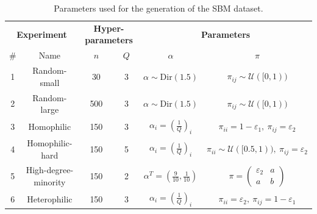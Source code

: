 \documentclass[switch, 12pt]{article}
\begin{document}
\begin{multicols}{2}
    \begin{table}[ht]
        \centering
        \setlength\heavyrulewidth{0.25ex}
        \begin{tabular}{@{}cccccc@{}}
            \toprule
            \multicolumn{2}{c}{\textbf{Experiment}} & \multicolumn{2}{c}{\textbf{Hyper-parameters}} & \multicolumn{2}{c}{\textbf{Parameters}}                                                                                                                                          \\
            \#                                      & Name                                          & $n$                                     & $Q$                    & $\alpha$                                  & $\pi$                                                             \\ \midrule
            1                                       & \multicolumn{1}{c|}{Random-small}             & 30                                      & \multicolumn{1}{c|}{3} & $\alpha \sim \text{Dir}(1.5)$             & $\pi_{ij} \sim \mathcal{U}([0, 1))$                               \\
            2                                       & \multicolumn{1}{c|}{Random-large}             & 500                                     & \multicolumn{1}{c|}{3} & $\alpha \sim \text{Dir}(1.5)$             & $\pi_{ij} \sim \mathcal{U}([0, 1))$                               \\
            3                                       & \multicolumn{1}{c|}{Homophilic}               & 150                                     & \multicolumn{1}{c|}{3} & $\alpha_i = (\frac{1}{Q})_i$              & $\pi_{ii} = 1-\varepsilon_1, \ \pi_{ij} = \varepsilon_2$          \\
            4                                       & \multicolumn{1}{c|}{Homophilic-hard}          & 150                                     & \multicolumn{1}{c|}{5} & $\alpha_i = (\frac{1}{Q})_i$              & $\pi_{ii} \sim \mathcal{U}([0.5, 1)), \ \pi_{ij} = \varepsilon_2$ \\
            5                                       & \multicolumn{1}{c|}{High-degree-minority}     & 150                                     & \multicolumn{1}{c|}{2} & $\alpha^T = (\frac{9}{10}, \frac{1}{10})$ & $\pi = \begin{pmatrix} \varepsilon_2 & a \\ a & b \end{pmatrix}$  \\
            6                                       & \multicolumn{1}{c|}{Heterophilic}             & 150                                     & \multicolumn{1}{c|}{3} & $\alpha_i = (\frac{1}{Q})_i$              & $\pi_{ii} = \varepsilon_2, \ \pi_{ij} = 1 - \varepsilon_1$        \\ \bottomrule
        \end{tabular}
        \caption{Parameters used for the generation of the SBM dataset.}
        \label{tab:sbm_parameters}
    \end{table}



\end{multicols}
\end{document}

